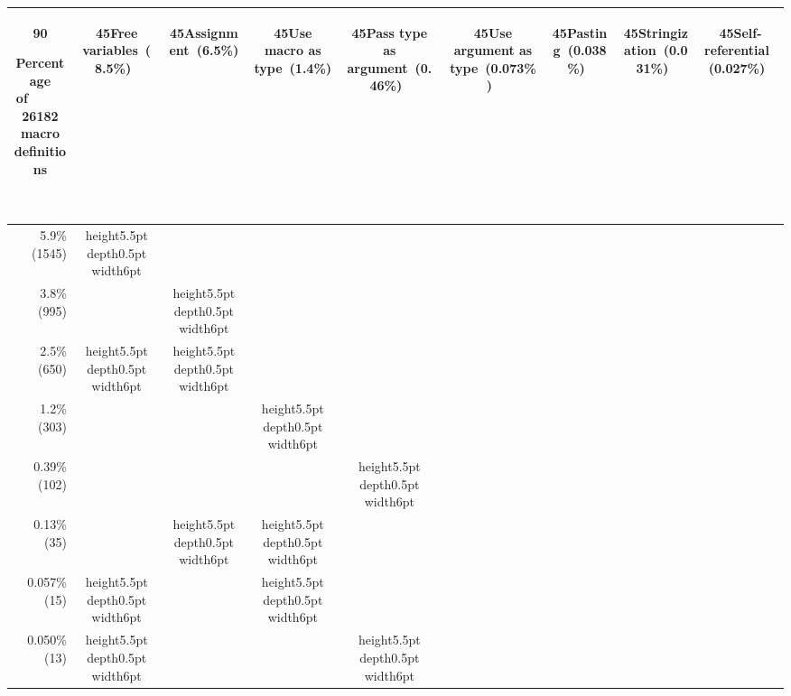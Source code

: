 
\newcommand{\black}{\vrule height5.5pt depth0.5pt width6pt}
{\footnotesize
\addtolength{\tabcolsep}{-.4\tabcolsep}
\begin{tabular}{|r|*{8}{c|}}
\multicolumn{1}{c}{\begin{rotate}{90}{\parbox{1in}{Percentage of~~~~~ \\ 26182 macro \\ definitions}~}\end{rotate}} &
\multicolumn{1}{c}{\begin{rotate}{45}{Free variables~(8.5\%)~}\end{rotate}} &
\multicolumn{1}{c}{\begin{rotate}{45}{Assignment~(6.5\%)~}\end{rotate}} &
\multicolumn{1}{c}{\begin{rotate}{45}{Use macro as type~(1.4\%)~}\end{rotate}} &
\multicolumn{1}{c}{\begin{rotate}{45}{Pass type as argument~(0.46\%)~}\end{rotate}} &
\multicolumn{1}{c}{\begin{rotate}{45}{Use argument as type~(0.073\%)~}\end{rotate}} &
\multicolumn{1}{c}{\begin{rotate}{45}{Pasting~(0.038\%)~}\end{rotate}} &
\multicolumn{1}{c}{\begin{rotate}{45}{Stringization~(0.031\%)~}\end{rotate}} &
\multicolumn{1}{c}{\begin{rotate}{45}{Self-referential~(0.027\%)~}\end{rotate}}
\\ \hline
5.9\% (1545)&\black& & & & & & & \\ \hline
3.8\% (995)& &\black& & & & & & \\ \hline
2.5\% (650)&\black&\black& & & & & & \\ \hline
1.2\% (303)& & &\black& & & & & \\ \hline
0.39\% (102)& & & &\black& & & & \\ \hline
0.13\% (35)& &\black&\black& & & & & \\ \hline
0.057\% (15)&\black& &\black& & & & & \\ \hline
0.050\% (13)&\black& & &\black& & & & \\ \hline

\end{tabular}}
